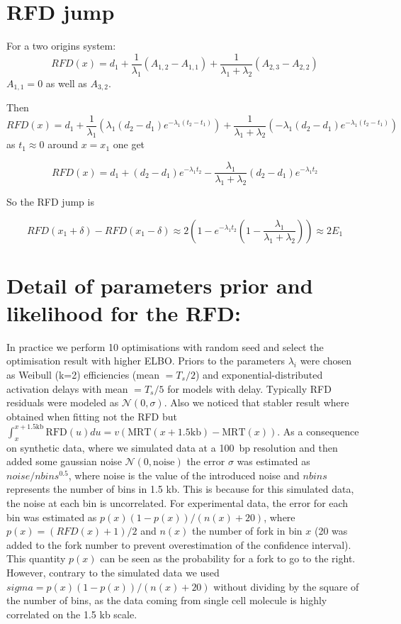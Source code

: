 \documentclass[10pt,a4paper]{revtex4-2}
\begin{document}
\section{RFD jump}\label{seq:rfdj}

For a two origins system:
\begin{equation}
RFD(x) = d_1 + \frac{1}{\lambda_1}(A_{1,2}-A_{1,1})+\frac{1}{\lambda_1+\lambda_2}(A_{2,3}-A_{2,2})
\end{equation}
$A_{1,1}=0$ as well as $A_{3,2}$.

Then 
\begin{equation}
RFD(x) = d_1 + \frac{1}{\lambda_1}(\lambda_1(d_2-d_1)e^{-\lambda_1(t_2-t_1)})+\frac{1}{\lambda_1+\lambda_2}(-\lambda_1(d_2-d_1)e^{-\lambda_1(t_2-t_1)})
\end{equation}
as $t_1\approx 0$ around $x=x_1$
one get 

\begin{equation}
RFD(x) = d_1 + (d_2-d_1)e^{-\lambda_1 t_2}-\frac{\lambda_1}{\lambda_1+\lambda_2}(d_2-d_1)e^{-\lambda_1 t_2}
\end{equation}

So the RFD jump is

\begin{equation}
RFD(x_1+\delta)-RFD(x_1-\delta) \approx 2\left(1 - e^{-\lambda_1 t_2}(1-\frac{\lambda_1}{\lambda_1+\lambda_2})\right)  \approx 2E_1
\end{equation}

\section{Detail of parameters prior and likelihood for the RFD:}\label{sup:detail}

In practice we perform 10 optimisations with random seed and select the optimisation result with higher ELBO.
Priors to the parameters $\lambda_i$ were chosen as Weibull (k=2) efficiencies (mean $= T_s/2$) and exponential-distributed activation delays with mean $= T_s/5$ for models with delay. 
Typically RFD residuals were modeled as $\mathcal{N}(0,\sigma)$. Also we noticed that stabler result where obtained when fitting not the RFD but $\int_x^{x+1.5\text{kb}}\text{RFD}(u)du = v (\text{MRT}(x+1.5\text{kb})-\text{MRT}(x))$.
As a consequence on synthetic data, where we simulated data at a 100~bp resolution and then added some gaussian noise $\mathcal{N}(0,\text{noise})$ the error $\sigma$ was estimated as $noise/nbins^{0.5}$, where noise is the value of the introduced noise and $nbins$ represents the number of bins in 1.5 kb. This is because for this simulated data, the noise at each bin is uncorrelated. For experimental data, the error for each bin was estimated as $p(x)(1-p(x))/(n(x)+20)$, where $p(x)=(RFD(x)+1)/2$ and $n(x)$ the number of fork in bin $x$ (20 was added to the fork number to prevent overestimation of the confidence interval). This quantity $p(x)$ can be seen as the probability for a fork to go to the right. However, contrary to the simulated data we used $sigma =  p(x)(1-p(x))/(n(x)+20)$ without dividing by the square of the number of bins, as the data coming from single cell molecule is highly correlated on the 1.5 kb scale.
\end{document}
